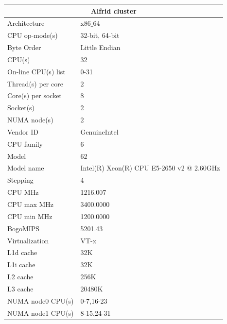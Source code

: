 \begin{tabular}{ |p{4cm}|p{8.8cm}| }
\hline
\multicolumn{2}{|c|}{Alfrid cluster} \\
\hline
\hline
Architecture &          x$86\_64$ \\
\hline
CPU op-mode(s) &        32-bit, 64-bit \\
\hline
Byte Order &            Little Endian \\
\hline
CPU(s) &                32 \\
\hline
On-line CPU(s) list &   0-31 \\
\hline
Thread(s) per core &    2 \\
\hline
Core(s) per socket &    8 \\
\hline
Socket(s) &             2 \\
\hline
NUMA node(s) &          2 \\
\hline
Vendor ID &             GenuineIntel \\
\hline
CPU family &            6 \\
\hline
Model &                 62 \\
\hline
Model name &            Intel(R) Xeon(R) CPU E5-2650 v2 @ 2.60GHz \\
\hline
Stepping &              4 \\
\hline
CPU MHz &               1216.007 \\
\hline
CPU max MHz &           3400.0000 \\
\hline
CPU min MHz &           1200.0000 \\
\hline
BogoMIPS &              5201.43 \\
\hline
Virtualization &        VT-x \\
\hline
L1d cache &            32K \\
\hline
L1i cache &            32K \\
\hline
L2 cache &            256K \\
\hline
L3 cache &              20480K \\
\hline
NUMA node0 CPU(s) &     0-7,16-23 \\
\hline
NUMA node1 CPU(s) &     8-15,24-31 \\
 \hline
 \end{tabular}

